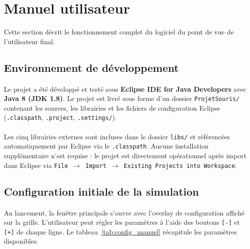 \section{Manuel utilisateur}
\label{sec:manuel}

\paragraph{} Cette section décrit le fonctionnement complet du logiciel du point de vue de l'utilisateur final.

\subsection{Environnement de développement}

\paragraph{} Le projet a été développé et testé sous \textbf{Eclipse IDE for Java
Developers} avec \textbf{Java 8 (JDK 1.8)}. Le projet est livré sous forme d'un
dossier \texttt{ProjetSouris/} contenant les sources, les librairies et les
fichiers de configuration Eclipse (\texttt{.classpath}, \texttt{.project},
\texttt{.settings/}).

\paragraph{} Les cinq librairies externes sont incluses dans le dossier
\texttt{libs/} et référencées automatiquement par Eclipse via le
\texttt{.classpath}. Aucune installation supplémentaire n'est requise : le
projet est directement opérationnel après import dans Eclipse via
\texttt{File $\rightarrow$ Import $\rightarrow$ Existing Projects into Workspace}.

\subsection{Configuration initiale de la simulation}

\paragraph{} Au lancement, la fenêtre principale s'ouvre avec l'overlay de configuration affiché sur la grille. L'utilisateur peut régler les paramètres à l'aide des boutons \texttt{[-]} et \texttt{[+]} de chaque ligne. Le tableau~\ref{tab:config_manuel} récapitule les paramètres disponibles.

